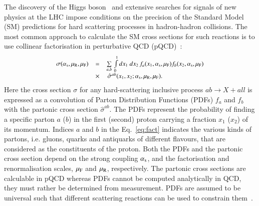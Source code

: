 The discovery of the Higgs boson~\cite{Aad:2012tfa,Chatrchyan:2012ufa}
and extensive searches for signals of new physics at the LHC impose
conditions on the precision of the Standard Model (SM) predictions for
hard scattering processes in hadron-hadron collisions.
The most common approach to calculate the SM cross sections for  
such reactions is to use collinear factorisation in perturbative QCD (pQCD)~\cite{Collins:1989}:
\begin{equation}
\small
\begin{array}{lcl}
\sigma(\alpha_\mathrm{s},\mu_\mathrm{R},\mu_\mathrm{F}) & = &
\sum\limits_{a,b}\,  \int\limits_{0}\limits^{1} dx_1\ dx_2\, f_a(x_1,\alpha_\mathrm{s},\mu_\mathrm{F}) 
 f_b(x_2,\alpha_\mathrm{s},\mu_\mathrm{F})\\ 
& \times & \, \hat{\sigma}^{ab}(x_1,x_2;\alpha_\mathrm{s},\mu_\mathrm{R},\mu_\mathrm{F}).
\label{eq:fact}
\end{array}
\end{equation}
Here the cross section $\sigma$ for 
any hard-scattering inclusive process $ab \rightarrow X + all$
is expressed
as a convolution of Parton Distribution Functions (PDFs) $f_a$ and $f_b$
with the partonic cross section
$\hat{\sigma}^{ab}$.
%
The PDFs represent 
the probability of finding a specific parton $a$ ($b$) in the first (second) proton carrying a fraction $x_1$ ($x_2$) of its momentum.
%
Indices $a$ and $b$ in the Eq.~\ref{eq:fact} indicates the various 
kinds of partons,
i.e. gluons, quarks and antiquarks of different flavours, 
that are considered
as the constituents of the proton.
%
Both the PDFs and the partonic cross section depend on the strong coupling
$\alpha_\mathrm{s}$, and the factorisation and renormalisation scales,
$\mu_\mathrm{F}$ and $\mu_\mathrm{R}$, respectively.
%
The partonic cross sections are calculable in pQCD whereas
PDFs cannot be computed analytically in QCD,
they must rather be determined from measurement. 
%
PDFs are assumed to be universal such that different scattering reactions can be used 
to constrain them~\cite{Perez:2012um,Forte:2013wc}.
%

